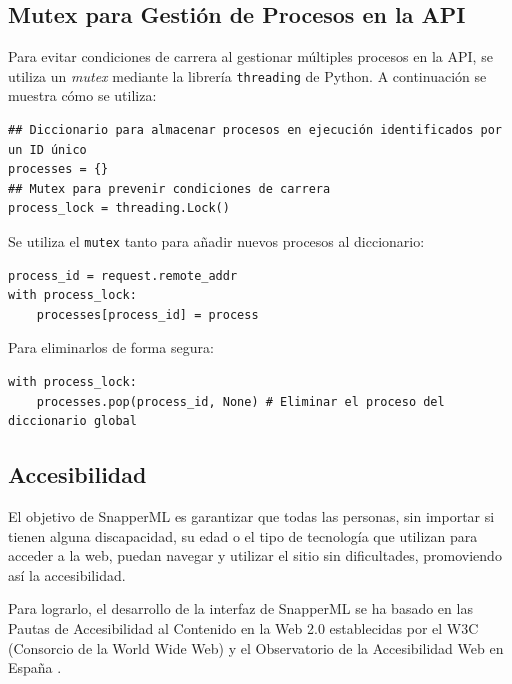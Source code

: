 \subsection{Mutex para Gestión de Procesos en la API}
Para evitar condiciones de carrera al gestionar múltiples procesos en la API, se utiliza un \textit{mutex} mediante la librería \texttt{threading} de Python. A continuación se muestra cómo se utiliza:

\begin{verbatim}
## Diccionario para almacenar procesos en ejecución identificados por un ID único
processes = {}
## Mutex para prevenir condiciones de carrera
process_lock = threading.Lock()
\end{verbatim}

Se utiliza el \texttt{mutex} tanto para añadir nuevos procesos al diccionario:
\begin{verbatim}
process_id = request.remote_addr
with process_lock:
	processes[process_id] = process
\end{verbatim}
Para eliminarlos de forma segura:
\begin{verbatim}
with process_lock:
    processes.pop(process_id, None) # Eliminar el proceso del diccionario global
\end{verbatim}

\subsection{Accesibilidad}

El objetivo de SnapperML es garantizar que todas las personas, sin importar si tienen alguna discapacidad, su edad o el tipo de tecnología que utilizan para acceder a la web, puedan navegar y utilizar el sitio sin dificultades, promoviendo así la accesibilidad.

\vspace{4mm}

Para lograrlo, el desarrollo de la interfaz de SnapperML se ha basado en las Pautas de Accesibilidad al Contenido en la Web 2.0 establecidas por el W3C (Consorcio de la World Wide Web) y el Observatorio de la Accesibilidad Web en España \cite{accesibilidad_espania}.


